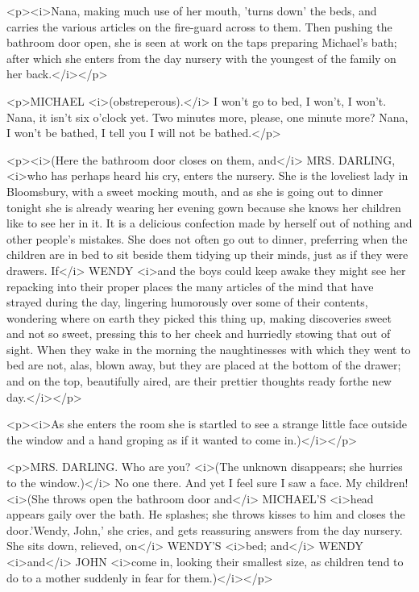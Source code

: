 <p><i>Nana, making much use of her mouth, 'turns down' the beds, and
carries the various articles on the fire-guard across to them. Then
pushing the bathroom door open, she is seen at work on the taps
preparing Michael's bath; after which she enters from the day nursery
with the youngest of the family on her back.</i></p>

<p>MICHAEL <i>(obstreperous).</i> I won't go to bed, I won't, I
won't. Nana, it isn't six o'clock yet. Two minutes more, please, one
minute more? Nana, I won't be bathed, I tell you I will not be
bathed.</p>

<p><i>(Here the bathroom door closes on them, and</i> MRS. DARLING,
<i>who has perhaps heard his cry, enters the nursery. She is the
loveliest lady in Bloomsbury, with a sweet mocking mouth, and as she
is going out to dinner tonight she is already wearing her evening
gown because she knows her children like to see her in it. It is a
delicious confection made by herself out of nothing and other
people's mistakes. She does not often go out to dinner, preferring
when the children are in bed to sit beside them tidying up their
minds, just as if they were drawers. If</i> WENDY <i>and the boys
could keep awake they might see her repacking into their proper
places the many articles of the mind that have strayed during the
day, lingering humorously over some of their contents, wondering
where on earth they picked this thing up, making discoveries sweet
and not so sweet, pressing this to her cheek and hurriedly stowing
that out of sight. When they wake in the morning the naughtinesses
with which they went to bed are not, alas, blown away, but they are
placed at the bottom of the drawer; and on the top, beautifully
aired, are their prettier thoughts ready forthe new day.</i></p>

<p><i>As she enters the room she is startled to see a strange little
face outside the window and a hand groping as if it wanted to come
in.)</i></p>

<p>MRS. DARLlNG. Who are you? <i>(The unknown disappears; she hurries
to the window.)</i> No one there. And yet I feel sure I saw a face.
My children! <i>(She throws open the bathroom door and</i> MICHAEL'S
<i>head appears gaily over the bath. He splashes; she throws kisses
to him and closes the door.'Wendy, John,' she cries, and gets
reassuring answers from the day nursery. She sits down, relieved,
on</i> WENDY'S <i>bed; and</i> WENDY <i>and</i> JOHN <i>come in,
looking their smallest size, as children tend to do to a mother
suddenly in fear for them.)</i></p>

